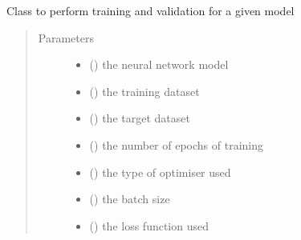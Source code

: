 \documentclass[letterpaper,10pt,english]{sphinxmanual}
\begin{document}
\begin{fulllineitems}
\label{\detokenize{index:Src.deeplearning.DeepLearning}}
Class to perform training and validation for a given model
\begin{quote}\begin{description}
\item[{Parameters}] \leavevmode\begin{itemize}
\item {} 
 () \textendash{} the neural network model

\item {} 
 () \textendash{} the training dataset

\item {} 
 () \textendash{} the target dataset

\item {} 
 () \textendash{} the number of epochs of training

\item {} 
 () \textendash{} the type of optimiser used

\item {} 
 () \textendash{} the batch size

\item {} 
 () \textendash{} the loss function used


\end{itemize}
\end{description}
\end{quote}
\end{fulllineitems}
\end{document}
